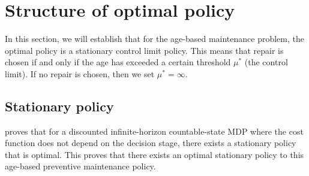 \documentclass[a4paper]{thesis}
\theoremstyle{definition}
\begin{document}
%
 \section{Structure of optimal policy}
In this section, we will establish that for the age-based maintenance problem, the optimal policy is a stationary control limit policy.
This means that repair is chosen if and only if the age has exceeded a certain threshold $\mu^*$ (the control limit).
If no repair is chosen, then we set $\mu^*=\infty$.

\subsection{Stationary policy}\label{section:AgeBasedStationaryPolicy}
\cite{Puterman2008} proves that for a discounted infinite-horizon countable-state MDP where the cost function does not depend on the decision stage, there exists a stationary policy that is optimal.
This proves that there exists an optimal stationary policy to this age-based preventive maintenance policy.
\end{document}
